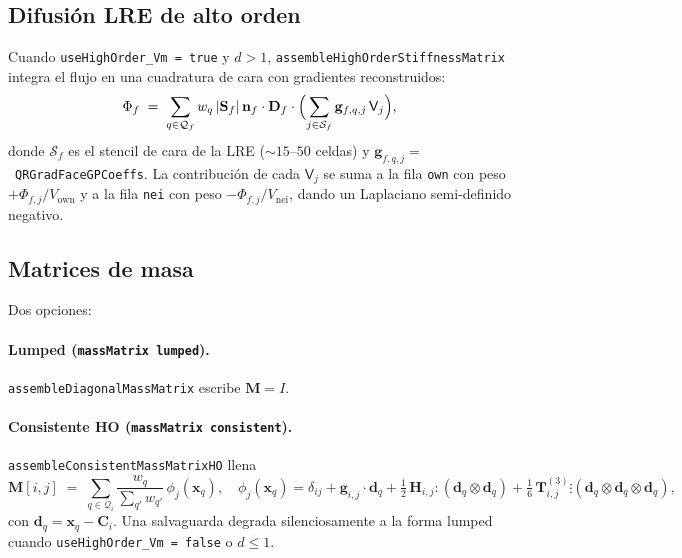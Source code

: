 \documentclass[11pt,a4paper]{article}
\newcommand{\code}[1]{\texttt{\small #1}}
\newcommand{\Dten}{\mathbf{D}}
\newcommand{\Mmass}{\mathbf{M}}
\begin{document}
\subsection{Difusión LRE de alto orden}

Cuando \code{useHighOrder\_Vm = true} y $d>1$,
\code{assembleHighOrderStiffnessMatrix} integra el flujo en una cuadratura de cara
con gradientes reconstruidos:
\begin{equation}
  \Phi_{f} \;=\;
   \sum_{q \in \mathcal{Q}_{f}}
       w_{q}\, \lvert \mathbf{S}_{f} \rvert\,
       \mathbf{n}_{f} \cdot \Dten_{f} \cdot
       \Bigl(
         \sum_{j \in \mathcal{S}_{f}}
            \mathbf{g}_{f,q,j}\, \mathsf{V}_{j}
       \Bigr),
   \label{eq:HO-flux}
\end{equation}
donde $\mathcal{S}_{f}$ es el stencil de cara de la LRE ($\sim 15$--$50$ celdas)
y $\mathbf{g}_{f,q,j} = $~\code{QRGradFaceGPCoeffs}. La contribución de cada
$\mathsf{V}_{j}$ se suma a la fila \code{own} con peso $+\Phi_{f,j}/V_{\text{own}}$
y a la fila \code{nei} con peso $-\Phi_{f,j}/V_{\text{nei}}$, dando un Laplaciano
semi-definido negativo.

\subsection{Matrices de masa}

Dos opciones:
\paragraph{Lumped (\code{massMatrix lumped}).}
\code{assembleDiagonalMassMatrix} escribe $\Mmass = I$.

\paragraph{Consistente HO (\code{massMatrix consistent}).}
\code{assembleConsistentMassMatrixHO} llena
\begin{equation}
  \Mmass[i, j] \;=\;
   \sum_{q \in \mathcal{Q}_{i}}
       \frac{w_{q}}{\sum_{q'} w_{q'}}\,
       \phi_{j}(\mathbf{x}_{q}),
   \quad
   \phi_{j}(\mathbf{x}_{q})
    = \delta_{ij}
    + \mathbf{g}_{i,j} \cdot \mathbf{d}_{q}
    + \tfrac{1}{2}\, \mathbf{H}_{i,j} \!:\! (\mathbf{d}_{q} \otimes \mathbf{d}_{q})
    + \tfrac{1}{6}\, \mathbf{T}^{(3)}_{i,j} \!\vdots\!
        (\mathbf{d}_{q} \otimes \mathbf{d}_{q} \otimes \mathbf{d}_{q}),
   \label{eq:HO-mass}
\end{equation}
con $\mathbf{d}_{q} = \mathbf{x}_{q} - \mathbf{C}_{i}$. Una salvaguarda degrada
silenciosamente a la forma lumped cuando \code{useHighOrder\_Vm = false} o
$d \le 1$.
\end{document}
